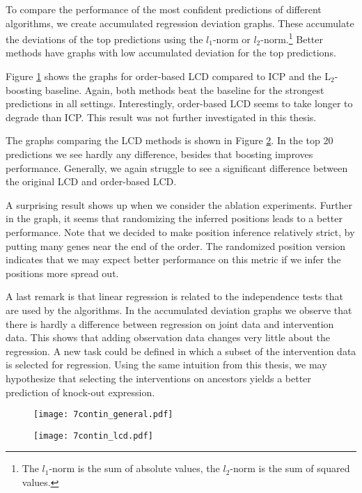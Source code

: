 To compare the performance of the most confident predictions of different algorithms, we create accumulated regression deviation graphs. These accumulate the deviations of the top predictions using the $l_1$-norm or $l_2$-norm.\footnote{The $l_1$-norm is the sum of absolute values, the $l_2$-norm is the sum of squared values.} Better methods have graphs with low accumulated deviation for the top predictions.

Figure \ref{fig:7:congen} shows the graphs for order-based LCD compared to ICP and the L$_2$-boosting baseline. Again, both methods beat the baseline for the strongest predictions in all settings. Interestingly, order-based LCD seems to take longer to degrade than ICP. This result was not further investigated in this thesis.

The graphs comparing the LCD methods is shown in Figure \ref{fig:7:conlcd}. In the top 20 predictions we see hardly any difference, besides that boosting improves performance. Generally, we again struggle to see a significant difference between the original LCD and order-based LCD. 

A surprising result shows up when we consider the ablation experiments. Further in the graph, it seems that randomizing the inferred positions leads to a better performance. Note that we decided to make position inference relatively strict, by putting many genes near the end of the order. The randomized position version indicates that we may expect better performance on this metric if we infer the positions more spread out. 

A last remark is that linear regression is related to the independence tests that are used by the algorithms. In the accumulated deviation graphs we observe that there is hardly a difference between regression on joint data and intervention data. This shows that adding observation data changes very little about the regression. A new task could be defined in which a subset of the intervention data is selected for regression. Using the same intuition from this thesis, we may hypothesize that selecting the interventions on ancestors yields a better prediction of knock-out expression.


\begin{figure}[h]
    \centering
    \texttt{[image: 7contin\_general.pdf]}
    \caption{}
    \label{fig:7:congen}
\end{figure}

\begin{figure}[h]
    \centering
    \texttt{[image: 7contin\_lcd.pdf]}
    \caption{}
    \label{fig:7:conlcd}
\end{figure}



